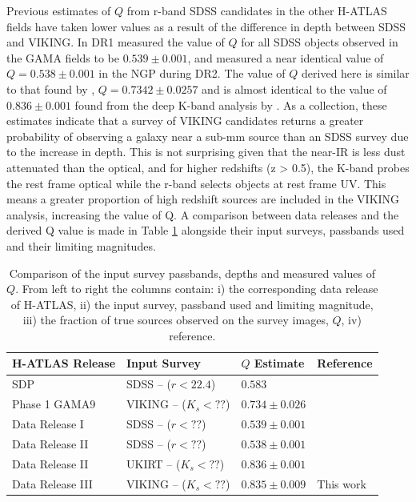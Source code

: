 Previous estimates of $Q$ from r-band SDSS candidates in the other H-ATLAS fields have taken lower values as a result of the difference in depth between SDSS and VIKING. In DR1 \citealt{Bourne_2016} measured the value of $Q$ for all SDSS objects observed in the GAMA fields to be $0.539\pm0.001$, and \citealt{Furlanetto_2018} measured a near identical value of $Q=0.538\pm0.001$ in the NGP during DR2. The value of $Q$ derived here is similar to that found by \citealt{Fleuren_2012}, $Q = 0.7342\pm0.0257$ and is almost identical to the value of $0.836\pm0.001$ found from the deep K-band analysis by \citealt{Furlanetto_2018}. As a collection, these estimates indicate that a survey of VIKING candidates returns a greater probability of observing a galaxy near a sub-mm source than an SDSS survey due to the increase in depth. This is not surprising given that the near-IR is less dust attenuated than the optical, and for higher redshifts (z > 0.5), the K-band probes the rest frame optical while the r-band selects objects at rest frame UV. This means a greater proportion of high redshift sources are included in the VIKING analysis, increasing the value of Q. A comparison between data releases and the derived Q value is made in Table \ref{tab:data_release_input_surveys} alongside their input surveys, passbands used and their limiting magnitudes.

\begin{table}
\centering
\begin{tabular}{p{3.5cm}|p{3.5cm}|p{2.5cm}|p{4cm}}
    \hline
    \hline
    H-ATLAS Release & {\color{red} Input Survey} & $Q$ Estimate & Reference \\
    \hline
    \hline
    SDP & SDSS -- ($r < 22.4$) & $0.583$ & \citealt{Smith_2011} \\ 
    Phase 1 GAMA9 & VIKING -- ($K_s < ??$) & $0.734\pm0.026$ & \citealt{Fleuren_2012} \\
    Data Release I & SDSS -- ($r < ??$) & $0.539\pm0.001$ & \citealt{Bourne_2016} \\
    Data Release II & SDSS -- ($r < ??$) & $0.538\pm0.001$ & \citealt{Furlanetto_2018} \\
    Data Release II & UKIRT -- ($K_s < ??$) & $0.836\pm0.001$ & \citealt{Furlanetto_2018} \\
    Data Release III & VIKING -- ($K_s < ??$) & $0.835\pm0.009$ & This work \\
    \hline
\end{tabular}
\caption{Comparison of the input survey passbands, depths and measured values of $Q$. From left to right the columns contain: i) the corresponding data release of H-ATLAS, ii) the input survey, passband used and limiting magnitude, iii) the fraction of true sources observed on the survey images, $Q$, iv) reference.}
\label{tab:data_release_input_surveys}
\end{table}

